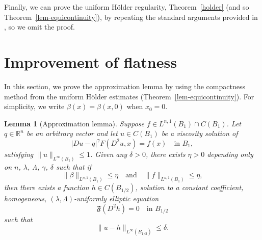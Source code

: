 \documentclass[11pt]{amsart}
\theoremstyle{plain}
\newtheorem{lemma}[theorem]{Lemma}
\theoremstyle{definition}
\numberwithin{equation}{section}
\begin{document}




Finally, we can prove the uniform H\"older regularity, Theorem~\ref{holder} (and so Theorem~\ref{lem-equicontinuity}), by repeating the standard arguments provided in \cite[Section~6]{IS16}, so we omit the proof.

\section{Improvement of flatness}\label{sec-improvement}
In this section, we prove the approximation lemma by using the compactness method from the uniform H\"older estimates (Theorem~\ref{lem-equicontinuity}). For simplicity, we write $\beta(x) = \beta(x, 0)$ when $x_0=0$.
\begin{lemma}[Approximation lemma]\label{lem-approximation}
    Suppose $f \in L^{n,1}(B_1) \cap C(B_1)$. 
    Let $q \in \mathbb{R}^n$ be an arbitrary vector and let $u \in C(B_1)$ be a viscosity solution of 
    \begin{equation*}
        |Du-q|^{\gamma}F(D^2u, x)=f(x)  \quad \text{in $B_1$},
    \end{equation*}
    satisfying $\|u\|_{L^{\infty}(B_1)} \leq 1$. Given any $\delta>0$, there exists $\eta>0$ depending only on $n$, $\lambda$, $\Lambda$, $\gamma$, $\delta$ such that if
    \begin{equation*}
        \|\beta\|_{L^{n,1}(B_1)} \leq \eta \quad \text{and} \quad \|f\|_{L^{n,1}(B_1)}  \leq \eta,
    \end{equation*}
    then there exists a function $h \in C(B_{1/2})$, solution to a constant coefficient, homogeneous, $(\lambda, \Lambda)$-uniformly elliptic equation
    \begin{equation}\label{eq-compactness}
        \mathfrak{F}(D^2h)=0 \quad \text{in $B_{1/2}$}
    \end{equation}
    such that
    \begin{equation*}
        \|u-h\|_{L^{\infty}(B_{1/2})} \leq \delta.
    \end{equation*}
\end{lemma}
\end{document}
